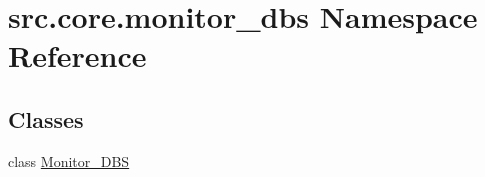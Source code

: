 \hypertarget{namespacesrc_1_1core_1_1monitor__dbs}{}\section{src.\+core.\+monitor\+\_\+dbs Namespace Reference}
\label{namespacesrc_1_1core_1_1monitor__dbs}
\subsection*{Classes}
\begin{DoxyCompactItemize}
\item 
class \hyperlink{classsrc_1_1core_1_1monitor__dbs_1_1Monitor__DBS}{Monitor\+\_\+\+D\+B\+S}
\end{DoxyCompactItemize}
